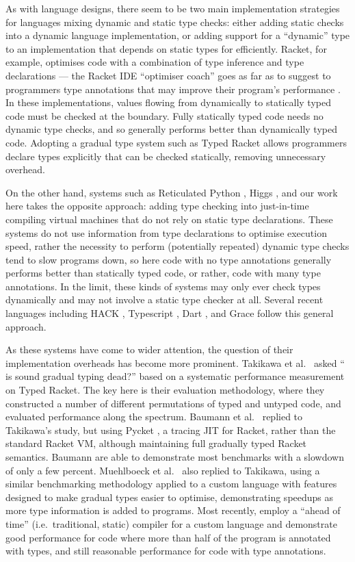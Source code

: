 As with language designs, there seem to be two main implementation
strategies for languages mixing dynamic and static type checks: either
adding static checks into a dynamic language implementation, or adding
support for a ``dynamic'' type to an implementation that depends on
static types for efficiently. Racket, for example, optimises code with
a combination of type inference and type declarations --- the Racket
IDE ``optimiser coach'' goes as far as to suggest to programmers type
annotations that may improve their program's performance
\cite{ShriramOptimiserCoach}. In these implementations, values flowing
from dynamically to statically typed code must be checked at the
boundary.  Fully statically typed code needs no dynamic type checks,
and so generally performs better than dynamically typed code. Adopting
a gradual type system such as Typed Racket \cite{TypedRacket} allows
programmers declare types explicitly that can be checked statically,
removing unnecessary overhead.

On the other hand, systems such as Reticulated Python
\cite{ReticulatedPython}, Higgs \cite{VM-aready-knew-that}, and our
work here takes the opposite approach: adding type checking into
just-in-time compiling virtual machines that do not rely on static
type declarations. These systems do not use information from type
declarations to optimise execution speed, rather the necessity to
perform (potentially repeated) dynamic type checks tend to slow
programs down, so here code with no type annotations generally
performs better than statically typed code, or rather, code with many
type annotations. In the limit, these kinds of systems may only ever
check types dynamically and may not involve a static type checker at
all.  Several recent languages including HACK \cite{HACK}, Typescript
\cite{typescript}, Dart \cite{dart}, and Grace \cite{grace} follow
this general approach.

As these systems have come to wider attention, the question of their
implementation overheads has become more prominent.  
Takikawa et al.\ \cite{Takikawa2016} asked `` is sound gradual typing
dead?'' based on a systematic performance measurement on Typed Racket.
The key here is their evaluation methodology, where they constructed a
number of different permutations of typed and untyped code, and
evaluated performance along the spectrum.
Baumann et al.\ \cite{Bauman2017} replied to Takikawa's study, but
using Pycket \cite{Pycketshortpaper}, a tracing JIT for Racket, rather
than the standard Racket VM, although maintaining full gradually typed
Racket semantics. Baumann are able to demonstrate most benchmarks
with a slowdown of only a few percent.
Muehlboeck et al.\ \cite{Muehlboeck2017} also replied to Takikawa, 
using a similar benchmarking methodology applied to a custom language
with features designed to make gradual types easier to optimise, 
demonstrating speedups as more type information is added to programs. 
Most recently, \citet{Kuhlenschmidt:2018:preprint} employ a
``ahead of time'' (i.e.\ traditional, static) compiler for a custom
language and demonstrate good performance for code where more than
half of the program is annotated with types, and still reasonable
performance for code with type annotations. 

